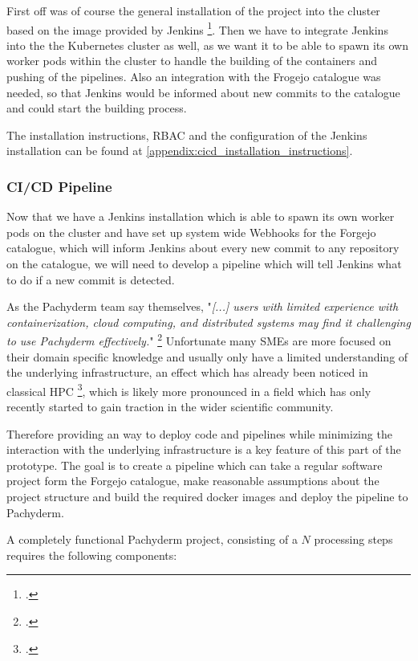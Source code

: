 First off was of course the general installation of the project into the cluster based on the image provided by Jenkins \footcite{JenkinsJenkinsJenkinsci}.
Then we have to integrate Jenkins into the the Kubernetes cluster as well, as we want it to be able to spawn its own worker pods within the cluster to handle the building of the containers and pushing of the pipelines.
Also an integration with the Frogejo catalogue was needed, so that Jenkins would be informed about new commits to the catalogue and could start the building process.

The installation instructions, \ac{RBAC} and the configuration of the Jenkins installation can be found at \ref{appendix:cicd_installation_instructions}.

\subsubsection{CI/CD Pipeline}

Now that we have a Jenkins installation which is able to spawn its own worker pods on the cluster and have set up system wide Webhooks for the Forgejo catalogue,
which will inform Jenkins about every new commit to any repository on the catalogue, we will need to develop a pipeline which will tell Jenkins what to do if a new commit is detected.

As the Pachyderm team say themselves, "\textit{[...] users with limited experience with containerization, cloud computing, and distributed systems may find it challenging to use Pachyderm effectively.}" \footcite{PachydermTargetAudience2023}
Unfortunate many \acp{SME} are more focused on their domain specific knowledge and usually only have a limited understanding of the underlying infrastructure, an effect which has already been noticed in classical \ac{HPC} \footcite{shenoiHPCEducationDomain2019}, 
which is likely more pronounced in a field which has only recently started to gain traction in the wider scientific community.

Therefore providing an way to deploy code and pipelines while minimizing the interaction with the underlying infrastructure is a key feature of this part of the prototype.
The goal is to create a pipeline which can take a regular software project form the Forgejo catalogue, make reasonable assumptions about the project structure and build the required docker images and deploy the pipeline to Pachyderm.

A completely functional Pachyderm project, consisting of a $N$ processing steps requires the following components:

